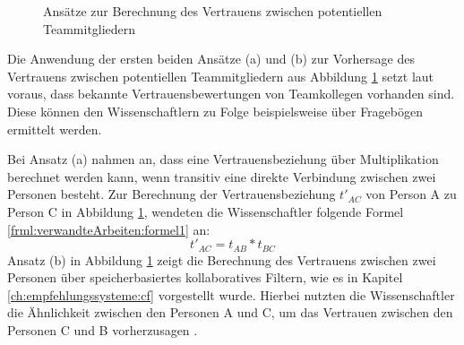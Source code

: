 \begin{figure}[h]
	\centering
	
	
	\caption{Ansätze zur Berechnung des Vertrauens zwischen potentiellen Teammitgliedern \cite[S. 5]{malinowski:2005}}
	\label{fig:verwandteArbeiten:abb2}
\end{figure}

Die Anwendung der ersten beiden Ansätze (a) und (b) zur Vorhersage des Vertrauens zwischen potentiellen Teammitgliedern aus Abbildung \ref{fig:verwandteArbeiten:abb2} setzt laut \textcite[S. 4ff.]{malinowski:2005} voraus, dass bekannte Vertrauensbewertungen von Teamkollegen vorhanden sind. Diese können den Wissenschaftlern zu Folge beispielsweise über Fragebögen ermittelt werden.

Bei Ansatz (a) nahmen \textcite[S. 5f.]{malinowski:2005} an, dass eine Vertrauensbeziehung über Multiplikation berechnet werden kann, wenn transitiv eine direkte Verbindung zwischen zwei Personen besteht. Zur Berechnung der Vertrauensbeziehung $t'_{AC}$ von Person A zu Person C in Abbildung \ref{fig:verwandteArbeiten:abb2}, wendeten die Wissenschaftler folgende Formel \ref{frml:verwandteArbeiten:formel1} an:
\begin{equation}
	t'_{AC} = t_{AB} * t_{BC}
	\label{frml:verwandteArbeiten:formel1}
\end{equation}
Ansatz (b) in Abbildung \ref{fig:verwandteArbeiten:abb2} zeigt die Berechnung des Vertrauens zwischen zwei Personen über speicherbasiertes kollaboratives Filtern, wie es in Kapitel \ref{ch:empfehlungssysteme:cf} vorgestellt wurde. Hierbei nutzten die Wissenschaftler die Ähnlichkeit zwischen den Personen A und C, um das Vertrauen zwischen den Personen C und B vorherzusagen \cite[S. 6]{malinowski:2005}.

